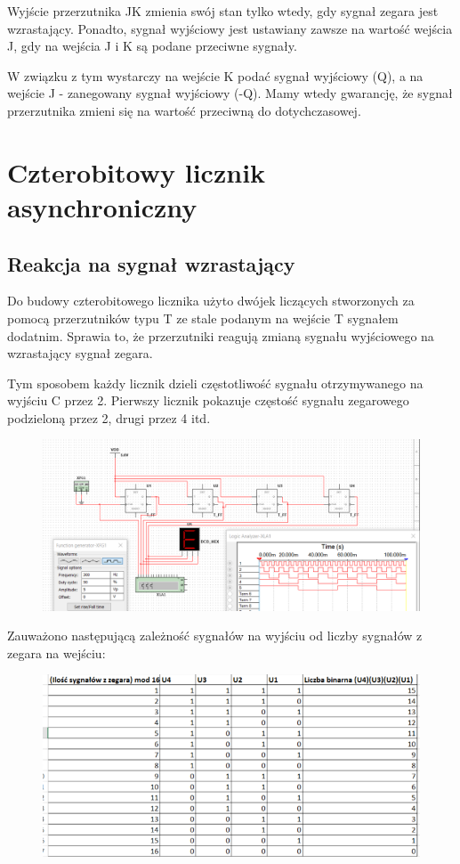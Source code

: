 \documentclass[12pt,a4paper]{article}
\begin{document}
Wyjście przerzutnika JK zmienia swój stan tylko wtedy, gdy sygnał zegara jest wzrastający. Ponadto, sygnał wyjściowy jest ustawiany zawsze na wartość wejścia J, gdy na wejścia J i K są podane przeciwne sygnały. 

W związku z tym wystarczy na wejście K podać sygnał wyjściowy (Q), a na wejście J - zanegowany sygnał wyjściowy (-Q). Mamy wtedy gwarancję, że sygnał przerzutnika zmieni się na wartość przeciwną do dotychczasowej.

\section{Czterobitowy licznik asynchroniczny}

\subsection{Reakcja na sygnał wzrastający}
Do budowy czterobitowego licznika użyto dwójek liczących stworzonych za pomocą przerzutników typu T ze stale podanym na wejście T sygnałem dodatnim. Sprawia to, że przerzutniki reagują zmianą sygnału wyjściowego na wzrastający sygnał zegara.
\par
Tym sposobem każdy licznik dzieli częstotliwość sygnału otrzymywanego na wyjściu C przez 2. Pierwszy licznik pokazuje częstość sygnału zegarowego podzieloną przez 2, drugi przez 4 itd.

\begin{figure}[H]
\centering
\includegraphics[width=\textwidth]{img/4b_wzrost}
\end{figure}

Zauważono następującą zależność sygnałów na wyjściu od liczby sygnałów z zegara na wejściu:

\begin{figure}[H]
\centering
\includegraphics[width=\textwidth]{img/4b_wzrost_table}
\end{figure}
\end{document}

